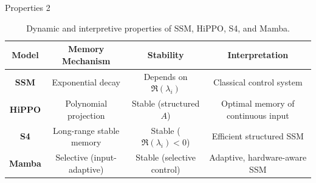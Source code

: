 \documentclass[xcolor=dvipsnames,aspectratio=169]{beamer}
\begin{document}
        \begin{frame}{Properties 2}
            \footnotesize
            \renewcommand{\arraystretch}{1.4}
            \setlength{\tabcolsep}{4pt}
            \begin{table}[h!]
                \centering
                \begin{tabular}{|c|c|c|c|}
                    \hline
                    \textbf{Model} & \textbf{Memory Mechanism} & \textbf{Stability} & \textbf{Interpretation} \\
                    \hline
                    \textbf{SSM} &
                    Exponential decay &
                    Depends on $\Re(\lambda_i)$ &
                    Classical control system \\
                    \hline
                    \textbf{HiPPO} &
                    Polynomial projection &
                    Stable (structured $A$) &
                    Optimal memory of continuous input \\
                    \hline
                    \textbf{S4} &
                    Long-range stable memory &
                    Stable ($\Re(\lambda_i)<0$) &
                    Efficient structured SSM \\
                    \hline
                    \textbf{Mamba} &
                    Selective (input-adaptive) &
                    Stable (selective control) &
                    Adaptive, hardware-aware SSM \\
                    \hline
                \end{tabular}
                \caption{Dynamic and interpretive properties of SSM, HiPPO, S4, and Mamba.}
            \end{table}
        \end{frame}
\end{document}
